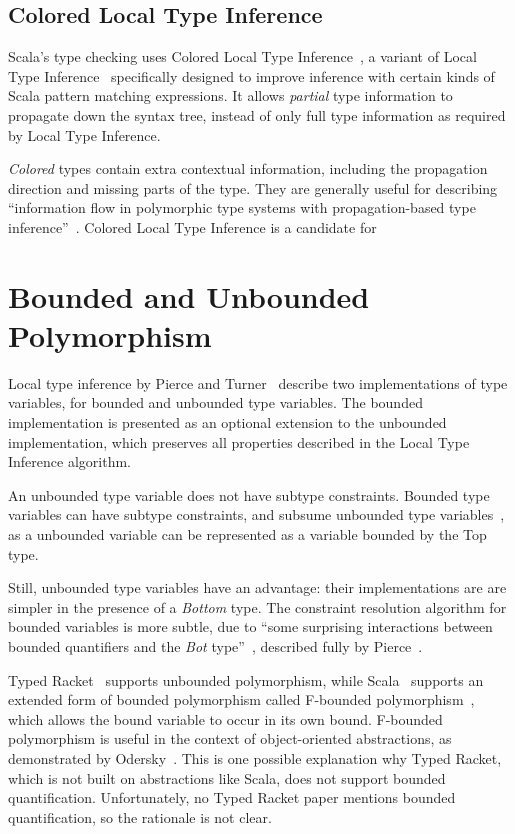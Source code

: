 \subsection{Colored Local Type Inference}

Scala's type checking uses Colored Local Type Inference~\cite{OZZ01},
a variant of Local Type Inference~\cite{PT00} specifically designed to
improve inference with certain kinds of Scala pattern matching expressions. It allows
 \emph{partial} type information to propagate down the syntax tree, instead of only full type information
as required by Local Type Inference.

\emph{Colored} types contain extra contextual information, including the propagation direction
and missing parts of the type. They are generally useful
for describing ``information flow in polymorphic type systems with propagation-based type inference''~\cite{OZZ01}. 
Colored Local Type Inference is a candidate for 

\section{Bounded and Unbounded Polymorphism}

Local type inference by Pierce and Turner~\cite{PT00}
describe two implementations of type variables, for bounded
and unbounded type variables. The bounded implementation is presented
as an optional extension  to the unbounded implementation, which preserves all
properties described in the Local Type Inference algorithm.

An unbounded type variable does not have subtype constraints.
Bounded type variables can have subtype constraints, and 
subsume unbounded type variables~\cite{PT00}, 
as a unbounded variable can be represented as a variable bounded
by the Top type.

Still, unbounded type variables have an advantage: their implementations are
are simpler in the presence of a \emph{Bottom} type. 
The constraint resolution algorithm for bounded variables
is more subtle, due to ``some surprising interactions between bounded quantifiers
and the \emph{Bot} type''~\cite{PT00}, described fully
by Pierce~\cite{Pie97}.

Typed Racket~\cite{TF08}
supports unbounded polymorphism, while Scala~\cite{OCD+}
supports an extended form of bounded polymorphism called
F-bounded polymorphism~\cite{CCHOM89}, which allows the
bound variable to occur in its own bound.
F-bounded polymorphism is useful in the context of object-oriented abstractions,
as demonstrated by Odersky~\cite{OCD+}.
This is one possible explanation why Typed Racket, which is not built on abstractions like Scala,
does not support bounded quantification. Unfortunately, no Typed Racket paper mentions 
bounded quantification, so the rationale is not clear.

